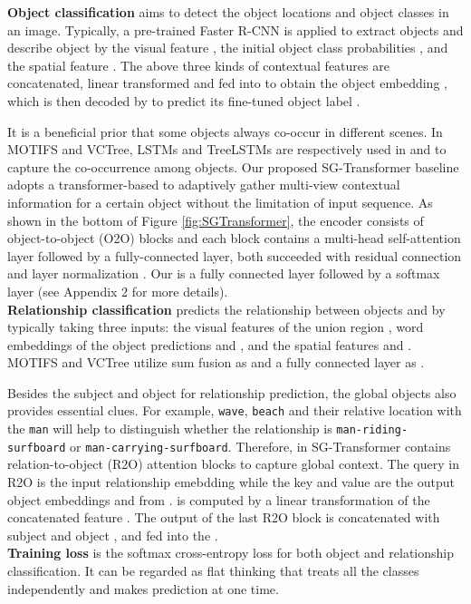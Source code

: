 \documentclass{article}
\begin{document}
\textbf{Object classification} aims to detect the object locations and object classes in an image. Typically, a pre-trained Faster R-CNN \cite{ren2015faster} is applied to extract  objects  and describe object  by the visual feature , the initial object class probabilities , and the spatial feature . The above three kinds of contextual features are concatenated, linear transformed and fed into  to obtain the object embedding , which is then decoded by   to predict its fine-tuned object label .

It is a beneficial prior that some objects always co-occur in different scenes. In MOTIFS and VCTree, LSTMs and TreeLSTMs are respectively used in  and  to capture the  co-occurrence among objects. Our proposed SG-Transformer baseline adopts a transformer-based  to adaptively gather multi-view contextual information for a certain object without the limitation of input sequence. As shown in the bottom of Figure \ref{fig:SGTransformer}, the encoder consists of  object-to-object (O2O) blocks 
and each block contains a multi-head self-attention layer followed  by  a  fully-connected  layer,  both  succeeded with residual connection and layer normalization \cite{vaswani2017attention}. Our  is a fully connected layer followed by a softmax layer (see Appendix 2 for more details).\\
\textbf{Relationship classification} predicts the relationship  between objects  and   by typically taking three inputs: the visual features of the union region , word embeddings of the object predictions  and , and the spatial features  and . MOTIFS and VCTree utilize sum fusion as  and a fully connected layer as .

Besides the subject and object for relationship prediction, the global objects also provides essential clues. For example,  \texttt{wave}, \texttt{beach} and their relative location with the \texttt{man} will help to distinguish whether the relationship is \texttt{man}\texttt{-riding}\texttt{-surfboard} or \texttt{man}\texttt{-carrying}\texttt{-surfboard}. Therefore,  in SG-Transformer contains  relation-to-object (R2O) attention blocks to capture global context. The query in R2O is the input relationship emebdding  while the key and value are the output object embeddings  and  from .  is computed by a linear transformation of the concatenated feature . The output of the last R2O block is concatenated with subject  and object , and fed into the . \\
\textbf{Training loss} is the softmax cross-entropy loss \cite{zellers2018neural} for both object and relationship classification. It can be regarded as  flat thinking that treats all the classes independently and makes prediction at one time. 
\fi
\end{document}
